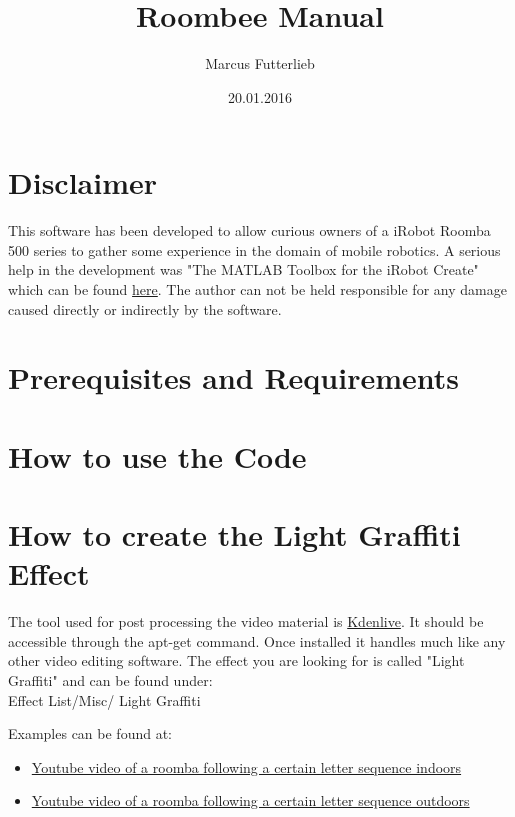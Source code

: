 \documentclass[a4paper,10pt]{book}
\title{Roombee Manual}
\author{Marcus Futterlieb}
\date{20.01.2016}
\begin{document}
\dominitoc
\maketitle

\chapter{Disclaimer}
This software has been developed to allow curious owners of a iRobot Roomba 500 series to gather some experience in the domain of mobile robotics. 
A serious help in the development was "The MATLAB Toolbox for the iRobot Create" which can be found \href{http://www.usna.edu/Users/weapsys/esposito/roomba-matlab.php}{here}.
The author can not be held responsible for any damage caused directly or indirectly by the software. 


\chapter{Prerequisites and Requirements}
\chapter{How to use the Code}
\chapter{How to create the Light Graffiti Effect}
The tool used for post processing the video material is \href{https://kdenlive.org/}{Kdenlive}.
It should be accessible through the apt-get command.
Once installed it handles much like any other video editing software.
The effect you are looking for is called "Light Graffiti" and can be found under:\\
Effect List/Misc/ Light Graffiti

\vspace {0.5cm}

Examples can be found at:

\begin{itemize}
  \item \href{https://youtu.be/hPpPM0kasyk}{Youtube video of a roomba following a certain letter sequence indoors}
  \item \href{https://youtu.be/g-6yrYu4PUs}{Youtube video of a roomba following a certain letter sequence outdoors}
\end{itemize}
\end{document}
